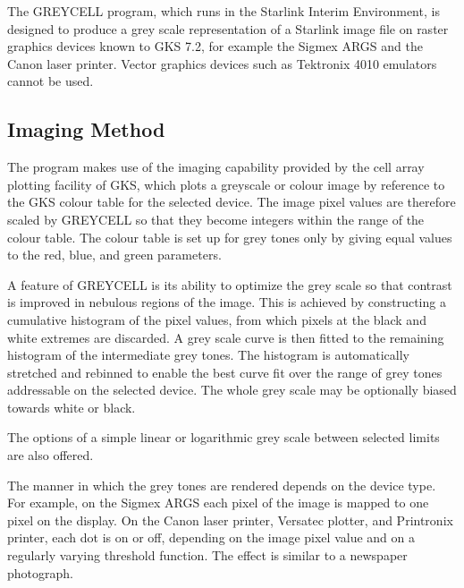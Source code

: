 The GREYCELL program, which runs in the Starlink Interim Environment, is
designed to produce a grey scale representation of a Starlink image file on
raster graphics devices known to GKS 7.2, for example the Sigmex ARGS and the 
Canon laser printer.
Vector graphics devices such as Tektronix 4010 emulators cannot be used. 

\subsection{Imaging Method}

The program makes use of the imaging capability provided by the cell array 
plotting facility of GKS, which plots a greyscale or colour image by 
reference to the GKS colour table for the selected device.
The image pixel values are therefore scaled by GREYCELL so that they become
integers within the  range of the colour table.
The colour table is set up for grey tones only by giving equal values to the
red, blue, and green parameters.

A feature of GREYCELL is its ability to optimize the grey scale so that contrast
is improved in nebulous regions of the image.
This is achieved by constructing a cumulative histogram of the pixel values,
from which pixels at the black and white extremes are discarded.
A grey scale curve is then fitted to the remaining histogram of the intermediate
grey tones.
The histogram is automatically stretched and rebinned to enable the best curve
fit over the range of grey tones addressable on the selected device.
The whole grey scale may be optionally biased towards white or black.

The options of a simple linear or logarithmic grey scale between selected 
limits are also offered. 
 
The manner in which the grey tones are rendered depends on the device 
type.
For example, on the Sigmex ARGS each pixel of the image is mapped to one pixel
on the display.
On the Canon laser printer, Versatec plotter, and Printronix printer, each dot
is on or off, depending on the image pixel value and on a regularly varying
threshold function.
The effect is similar to a newspaper photograph.


